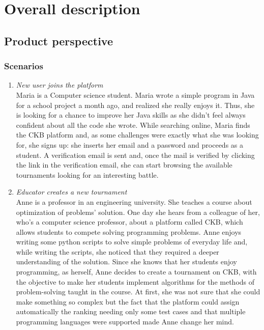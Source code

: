 \documentclass[12pt, a4paper]{report}
\begin{document}
\chapter{Overall description}

    \section{Product perspective}

    \subsection{Scenarios}
    \begin{enumerate}
        \item \textit{New user joins the platform}\\
            Maria is a Computer science student. Maria wrote a simple program in Java for a school project a month ago, and realized she really enjoys it. 
            Thus, she is looking for a chance to improve her Java skills as she didn't feel always confident about all the code she wrote.
            While searching online, Maria finds the CKB platform and, as some challenges were exactly what she was looking for, she signs up: she inserts her email and a password and proceeds as a student.
            A verification email is sent and, once the mail is verified by clicking the link in the verification email, she can start browsing the available tournaments looking for an interesting battle.
        \item \textit{Educator creates a new tournament} \\
            Anne is a professor in an engineering university.
            She teaches a course about optimization of problems' solution.
            One day she hears from a colleague of her, who's a computer science professor, about a platform called CKB, which allows students to compete solving programming problems.
            Anne enjoys writing some python scripts to solve simple problems of everyday life and, while writing the scripts, she noticed that they required a deeper understanding of the solution.
            Since she knows that her students enjoy programming, as herself, Anne decides to create a tournament on CKB, with the objective to make her students implement algorithms for the methods of problem-solving taught in the course.
            At first, she was not sure that she could make something so complex but the fact that the platform could assign automatically the ranking needing only some test cases and that multiple programming languages were supported made Anne change her mind.

\end{enumerate}
\end{document}
